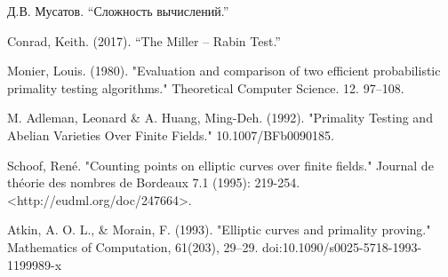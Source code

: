 \documentclass[12pt]{article}
\theoremstyle{definition}
\numberwithin{Def}{section}
\numberwithin{Th}{section}
\numberwithin{St}{section}
\numberwithin{Cor}{section}
\begin{document}
\begin{enumerate}[{[}1{]}]
	\item Д.В. Мусатов. “Сложность вычислений.”
	\item \label{Conrad} Conrad, Keith. (2017). “The Miller – Rabin Test.”
	\item \label{Monier} Monier, Louis. (1980). "Evaluation and comparison of two efficient
	probabilistic primality testing algorithms."
	Theoretical Computer Science. 12. 97–108.
	\item \label{Adleman} M. Adleman, Leonard \& A. Huang, Ming-Deh. (1992).
	"Primality Testing and Abelian Varieties Over Finite Fields."
	10.1007/BFb0090185.
	\item \label{Schoof} Schoof, René. "Counting points on elliptic curves over 
	finite fields." Journal de théorie des nombres de Bordeaux 7.1 (1995): 
	219-254. <http://eudml.org/doc/247664>.
	\item Atkin, A. O. L., \& Morain, F. (1993). "Elliptic curves and primality 
	proving." Mathematics of Computation, 61(203), 29–29.
	doi:10.1090/s0025-5718-1993-1199989-x
\end{enumerate}
\end{document}
